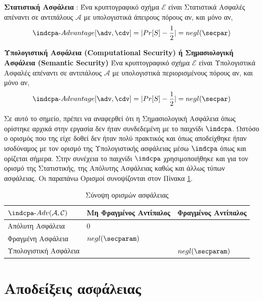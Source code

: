 \begin{definition}
\textbf{Στατιστική Ασφάλεια} : Ένα κρυπτογραφικό σχήμα $\mathcal{E}$ είναι Στατιστικά Ασφαλές απέναντι σε αντιπάλους $\mathcal{A}$ με υπολογιστικά άπειρους πόρους αν, και μόνο αν,
$$
\indcpa\text{-}Advantage[\adv, \cdv] = | Pr[S] - \dfrac{1}{2} | = negl(\secpar)
$$
\end{definition}

\begin{definition}
\textbf{Υπολογιστική Ασφάλεια (Computational Security) ή Σημασιολογική Ασφάλεια (Semantic Security)}
Ένα κρυπτογραφικό σχήμα $\mathcal{E}$ είναι Υπολογιστικά Ασφαλές απέναντι σε αντιπάλους $\mathcal{A}$ με υπολογιστικά περιορισμένους πόρους αν, και μόνο αν, 
$$
    \indcpa\text{-}Advantage[\adv, \cdv] = | Pr[S] - \dfrac{1}{2} | = negl(\secpar)
$$
\end{definition}

Σε αυτό το σημείο, πρέπει να αναφερθεί ότι η Σημασιολογική Ασφάλεια όπως ορίστηκε αρχικά στην εργασία \cite{10.1145/800070.802212} δεν ήταν συνδεδεμένη με το παιχνίδι $\indcpa$. Ωστόσο ο ορισμός που της είχε δοθεί δεν ήταν πολύ πρακτικός και όπως αποδείχθηκε ήταν ισοδύναμος με τον ορισμό της Υπολογιστικής ασφάλειας μέσω $\indcpa$ όπως και ορίζεται σήμερα. Στην συνέχεια το παιχνίδι $\indcpa$ χρησιμοποιήθηκε και για τον ορισμό της Στατιστικής, της Απόλυτης Ασφάλειας καθώς και άλλως τύπων ασφάλειας.
Οι παραπάνω Ορισμοί συνοψίζονται στον Πίνακα \ref{security_notions_summary}.

\begin{table}[]
\begin{center}
\begin{tabular}{|l|l|l|}
\hline
$\indcpa\text{-}Adv(\mathcal{A}, \mathcal{C})$ & Μη Φραγμένος Αντίπαλος   & Φραγμένος Αντίπαλος      \\ \hline
Απόλυτη Ασφάλεια      & $0$                      & \cellcolor[HTML]{C0C0C0} \\ \hline
Φραγμένη Ασφάλεια     & $negl(\secparam)$          & \cellcolor[HTML]{C0C0C0} \\ \hline
Υπολογιστική Ασφάλεια & \cellcolor[HTML]{C0C0C0} & $negl(\secparam)$            \\ \hline
\end{tabular}
\caption{Σύνοψη ορισμών ασφάλειας}
\label{security_notions_summary}
\end{center}
\end{table}

\section{Αποδείξεις ασφάλειας}

